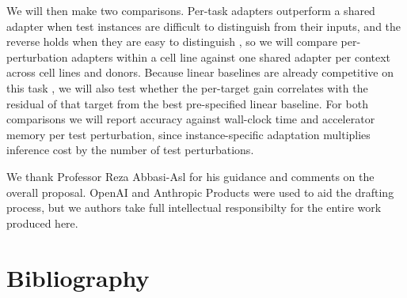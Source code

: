 \documentclass[times, twoside, watermark]{zHenriquesLab-StyleBioRxiv}
\begin{document}
We will then make two comparisons. Per-task adapters outperform a shared adapter when test instances are difficult to distinguish from their inputs, and the reverse holds when they are easy to distinguish \cite{akyurek2025ttt}, so we will compare per-perturbation adapters within a cell line against one shared adapter per context across cell lines and donors. Because linear baselines are already competitive on this task \cite{ahlmann2025linear}, we will also test whether the per-target gain correlates with the residual of that target from the best pre-specified linear baseline. For both comparisons we will report accuracy against wall-clock time and accelerator memory per test perturbation, since instance-specific adaptation multiplies inference cost by the number of test perturbations.

\setlength\parindent{0pt}

\begin{acknowledgements}
We thank Professor Reza Abbasi-Asl for his guidance and comments on the overall proposal. OpenAI and Anthropic Products were used to aid the drafting process, but we authors take full intellectual responsibilty for the entire work produced here.
\end{acknowledgements}

\section*{Bibliography}

\balance
\end{document}
